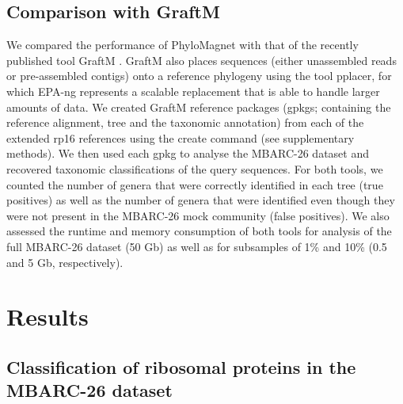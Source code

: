 \documentclass[a4paper]{article}
\begin{document}
\subsection{Comparison with GraftM}
We compared the performance of PhyloMagnet with that of the recently published tool GraftM \citep[][v0.11.1]{Boyd2018}. GraftM also places sequences (either unassembled reads or pre-assembled contigs) onto a reference phylogeny using the tool pplacer, for which EPA-ng represents a scalable replacement that is able to handle larger amounts of data.
We created GraftM reference packages (gpkgs; containing the reference alignment, tree and the taxonomic annotation) from each of the extended rp16 references using the create command (see supplementary methods). We then used each gpkg to analyse the MBARC-26 dataset and recovered taxonomic classifications of the query sequences.
For both tools, we counted the number of genera that were correctly identified in each tree (true positives) as well as the number of genera that were identified even though they were not present in the MBARC-26 mock community (false positives). We also assessed the runtime and memory consumption of both tools for analysis of the full MBARC-26 dataset (50 Gb) as well as for subsamples of 1\% and 10\% (0.5 and 5 Gb, respectively).


\section{Results}\label{results}
\subsection{Classification of ribosomal proteins in the MBARC-26 dataset}
\end{document}
